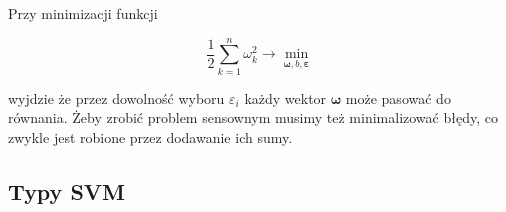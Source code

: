 \documentclass[paper=a4, fontsize=11pt]{scrartcl} %
\numberwithin{equation}{section} %
\numberwithin{figure}{section} %
\begin{document}
    \par Przy minimizacji funkcji

    \begin{equation}
        \frac{1}{2} \sum\limits_{k=1}^n \omega_{k}^2 \rightarrow \min\limits_{\pmb{\omega},b,
        \pmb{\varepsilon}}
    \end{equation}

    \par wyjdzie że przez dowolność wyboru $\varepsilon_i$ każdy wektor $\pmb{\omega}$ może
    pasować do równania. Żeby zrobić problem sensownym musimy też minimalizować błędy, co
    zwykle jest robione przez dodawanie ich sumy.


\subsection{Typy SVM}
\end{document}
